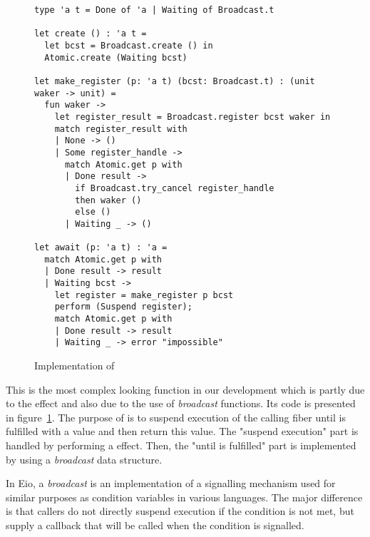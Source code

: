 \begin{figure}[ht]
  \begin{verbatim}
type 'a t = Done of 'a | Waiting of Broadcast.t

let create () : 'a t = 
  let bcst = Broadcast.create () in
  Atomic.create (Waiting bcst)

let make_register (p: 'a t) (bcst: Broadcast.t) : (unit waker -> unit) = 
  fun waker ->
    let register_result = Broadcast.register bcst waker in
    match register_result with
    | None -> ()
    | Some register_handle ->
      match Atomic.get p with
      | Done result ->  
        if Broadcast.try_cancel register_handle
        then waker ()
        else ()
      | Waiting _ -> ()

let await (p: 'a t) : 'a = 
  match Atomic.get p with
  | Done result -> result
  | Waiting bcst ->
    let register = make_register p bcst
    perform (Suspend register);
    match Atomic.get p with
    | Done result -> result 
    | Waiting _ -> error "impossible"
  \end{verbatim}
  \caption{Implementation of }
  \label{fig:sched-impl-await}
\end{figure}

This is the most complex looking function in our development which is partly due to the \esuspend{} effect and also due to the use of \emph{broadcast} functions.
Its code is presented in figure~\ref{fig:sched-impl-await}.
The purpose of  is to suspend execution of the calling fiber until  is fulfilled with a value and then return this value.
The "suspend execution" part is handled by performing a \esuspend{} effect.
Then, the "until  is fulfilled" part is implemented by using a \emph{broadcast} data structure.

In Eio, a \emph{broadcast} is an implementation of a signalling mechanism used for similar purposes as condition variables in various languages.
The major difference is that callers do not directly suspend execution if the condition is not met, but supply a callback that will be called when the condition is signalled.

